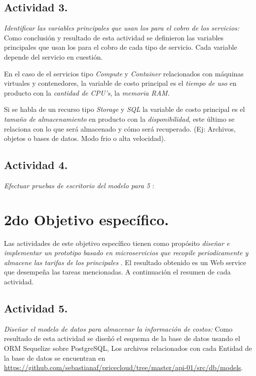\subsection{Actividad 3.}
\emph{Identificar las variables principales que usan los  para el cobro de los servicios:}
\newline\newline
Como conclusión y resultado de esta actividad se definieron las variables principales que usan los  para el cobro de cada tipo de servicio. Cada variable depende del servicio en cuestión.
\newline\newline

En el caso de el servicios tipo \emph{Compute} y \emph{Container} relacionados con máquinas virtuales y contenedores, la variable de costo principal es el \emph{tiempo de uso} en producto con la \emph{cantidad de CPU's}, la \emph{memoria RAM}.
\newline\newline

Si se habla de un recurso tipo \emph{Storage} y \emph{SQL} la variable de costo principal es el \emph{tamaño de almacenamiento} en producto con la \emph{disponibilidad}, este último se relaciona con lo que será almacenado y cómo será recuperado. (Ej: Archivos, objetos o bases de datos. Modo frio o alta velocidad).
\newline\newline

\subsection{Actividad 4.}
\emph{Efectuar pruebas de escritorio del modelo para 5 }:
\newline\newline

\section{2do Objetivo específico.}
Las actividades de este objetivo específico tienen como propósito \emph{diseñar e implementar un prototipo basado en microservicios que recopile periodicamente y almacene las tarifas de los principales }. El resultado obtenido es un Web service que desempeña las tareas mencionadas. A continuación el resumen de cada actividad.

\subsection{Actividad 5.}
\emph{Diseñar el modelo de datos para almacenar la información de costos:}
\newline\newline
Como resultado de esta actividad se diseñó el esquema de la base de datos usando el \acrshort{ORM} \gls{Sequelize} sobre \gls{PostgreSQL}, Los archivos relacionados con cada Entidad de la base de datos se encuentran en \url{https://github.com/sebastianaf/pricecloud/tree/master/api-01/src/db/models}.

